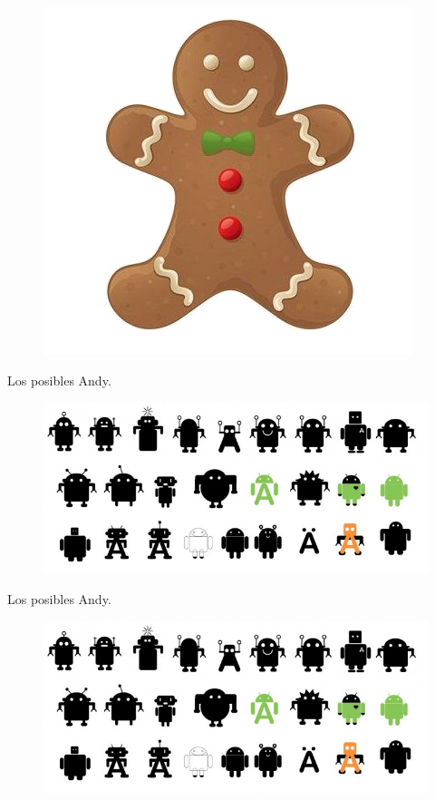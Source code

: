 \documentclass[12pt]{beamer} %
\begin{document}
\begin{slide}
  \begin{figure}[h]
      \includegraphics[height=0.9\textheight]{img/gingerbread.png}
    \end{figure}
\end{slide}
%


\begin{slide}

     Los posibles Andy.
  \begin{figure}[h]
      \includegraphics[height=0.5\textheight]{img/mutidroid.jpg}
    \end{figure}
\end{slide}

\begin{slide}

     Los posibles Andy.
  \begin{figure}[h]
      \includegraphics[height=0.5\textheight]{img/mutidroid.jpg}
    \end{figure}
\end{slide}
\end{document}

